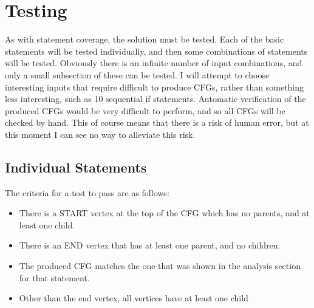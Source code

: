 \section{Testing}

As with statement coverage, the solution must be tested. Each of the basic statements will be tested individually, and then some combinations of statements will be tested. Obviously there is an infinite number of input combinations, and only a small subsection of these can be tested. I will attempt to choose interesting inputs that require difficult to produce CFGs, rather than something less interesting, such as 10 sequential if statements. Automatic verification of the produced CFGs would be very difficult to perform, and so all CFGs will be checked by hand. This of course means that there is a risk of human error, but at this moment I can see no way to alleviate this risk.

\subsection{Individual Statements}

The criteria for a test to pass are as follows:

\begin{itemize}[nolistsep]
\item There is a START vertex at the top of the CFG which has no parents, and at least one child.
\item There is an END vertex that has at least one parent, and no children.
\item The produced CFG matches the one that was shown in the analysis section for that statement.
\item Other than the end vertex, all vertices have at least one child
\end{itemize}

\begin{figure}
\centering
\begin{minipage}{.25\textwidth}
  \centering
  \caption{}
  \label{fig:testBlock}
\end{minipage}%
\begin{minipage}{.25\textwidth}
  \centering
  \caption{}
  \label{fig:testIf}
\end{minipage}%
\begin{minipage}{.25\textwidth}
  \centering
    \caption{}
  	\label{fig:testIfElse}
\end{minipage}
\begin{minipage}{.24\textwidth}
  \centering
  \caption{}
  \label{fig:testFor}
\end{minipage}
\end{figure}

